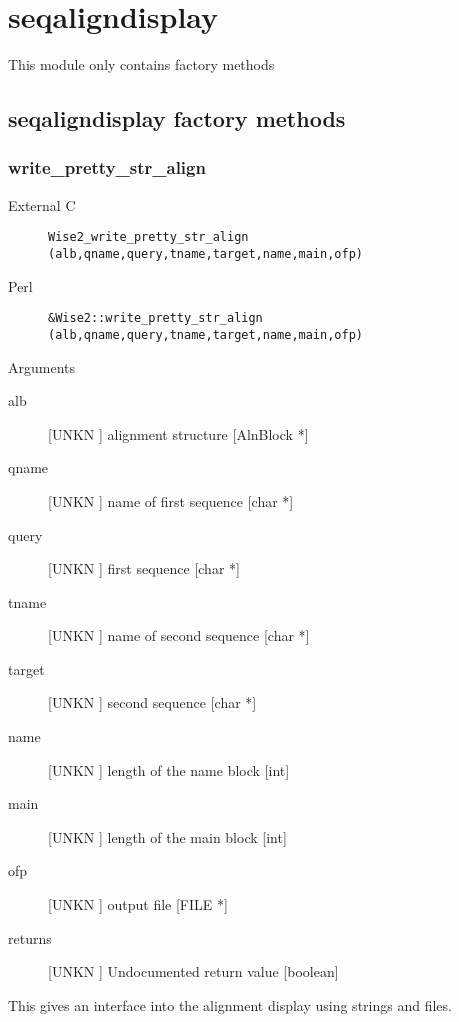 \section{seqaligndisplay}
\label{module_seqaligndisplay}
This module only contains factory methods

\subsection{seqaligndisplay factory methods}
\subsubsection{write_pretty_str_align}
\begin{description}
\item[External C] {\tt Wise2_write_pretty_str_align (alb,qname,query,tname,target,name,main,ofp)}
\item[Perl] {\tt &Wise2::write_pretty_str_align (alb,qname,query,tname,target,name,main,ofp)}

\end{description}
Arguments
\begin{description}
\item[alb] [UNKN ] alignment structure [AlnBlock *]
\item[qname] [UNKN ] name of first sequence [char *]
\item[query] [UNKN ] first sequence [char *]
\item[tname] [UNKN ] name of second sequence [char *]
\item[target] [UNKN ] second sequence [char *]
\item[name] [UNKN ] length of the name block [int]
\item[main] [UNKN ] length of the main block [int]
\item[ofp] [UNKN ] output file [FILE *]
\item[returns] [UNKN ] Undocumented return value [boolean]
\end{description}
This gives an interface into the alignment
display using strings and files.


